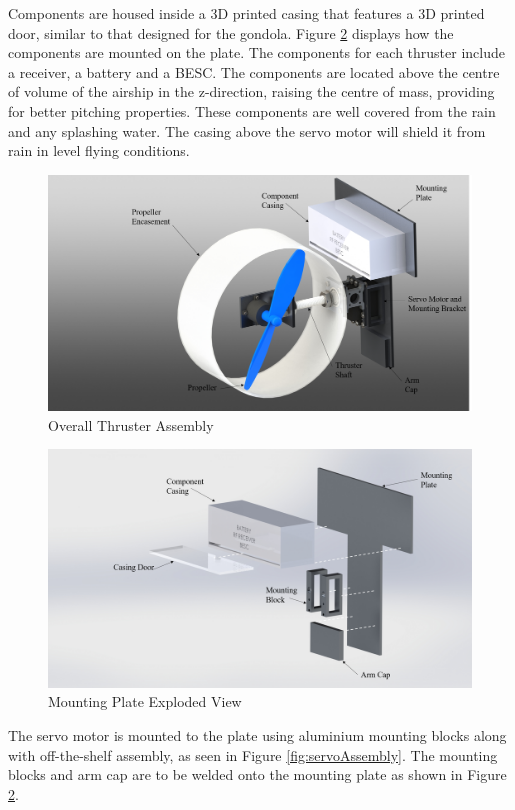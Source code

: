 \documentclass[../main.tex]{subfiles}
\begin{document}
Components are housed inside a 3D printed casing that features a 3D printed door, similar to that designed for the gondola. Figure \ref{fig:plateAssembly} displays how the components are mounted on the plate. The components for each thruster include a receiver, a battery and a BESC. The components are located above the centre of volume of the airship in the z-direction, raising the centre of mass, providing for better pitching properties. These components are well covered from the rain and any splashing water. The casing above the servo motor will shield it from rain in level flying conditions.

\begin{figure}[H]
	\centering
	\includegraphics[width=.8\linewidth]{img/design/thruster/thrusterAssembly.png}
	\caption{Overall Thruster Assembly}
	\label{fig:thrusterAssembly}
\end{figure}


\begin{figure}[H]
	\centering
	\includegraphics[width=.8\linewidth]{img/design/thruster/plateAssembly.png}
	\caption{Mounting Plate Exploded View}
	\label{fig:plateAssembly}
\end{figure}

 The servo motor is mounted to the plate using aluminium mounting blocks along with off-the-shelf assembly, as seen in Figure \ref{fig:servoAssembly}. The mounting blocks and arm cap are to be welded onto the mounting plate as shown in Figure \ref{fig:plateAssembly}.
 
\end{document}
